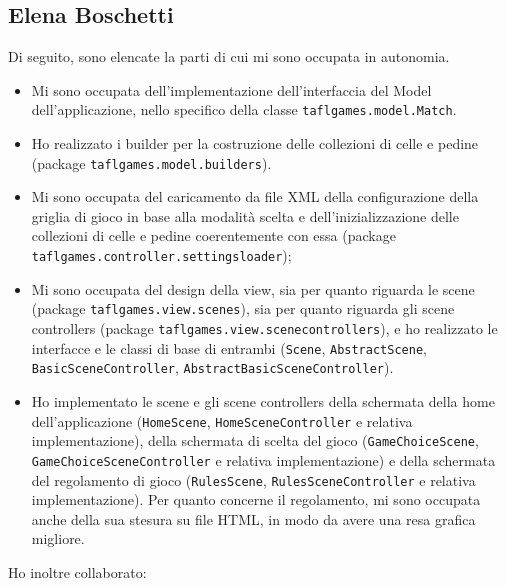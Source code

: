 \documentclass[a4paper,12pt]{report}
\begin{document}
\subsection{Elena Boschetti}

Di seguito, sono elencate la parti di cui mi sono occupata in autonomia.

\begin{itemize}
	\item Mi sono occupata dell'implementazione dell'interfaccia del Model dell'applicazione, nello specifico della classe \texttt{taflgames.model.Match}.
	\item Ho realizzato i builder per la costruzione delle collezioni di celle e pedine (package \texttt{taflgames.model.builders}).
	\item Mi sono occupata del caricamento da file XML della configurazione della griglia di gioco in base alla modalità scelta e dell'inizializzazione delle collezioni di celle e pedine coerentemente con essa (package \texttt{taflgames.controller.settingsloader});
	\item Mi sono occupata del design della view, sia per quanto riguarda le scene (package \texttt{taflgames.view.scenes}), sia per quanto riguarda gli scene controllers (package \texttt{taflgames.view.scenecontrollers}), e ho realizzato le interfacce e le classi di base di entrambi (\texttt{Scene}, \texttt{AbstractScene}, \texttt{BasicSceneController}, \texttt{AbstractBasicSceneController}).
	\item Ho implementato le scene e gli scene controllers della schermata della home dell'applicazione (\texttt{HomeScene}, \texttt{HomeSceneController} e relativa implementazione), della schermata di scelta del gioco (\texttt{GameChoiceScene}, \texttt{GameChoiceSceneController} e relativa implementazione) e della schermata del regolamento di gioco (\texttt{RulesScene}, \texttt{RulesSceneController} e relativa implementazione). Per quanto concerne il regolamento, mi sono occupata anche della sua stesura su file HTML, in modo da avere una resa grafica migliore.
	
\end{itemize}

Ho inoltre collaborato:
\end{document}
